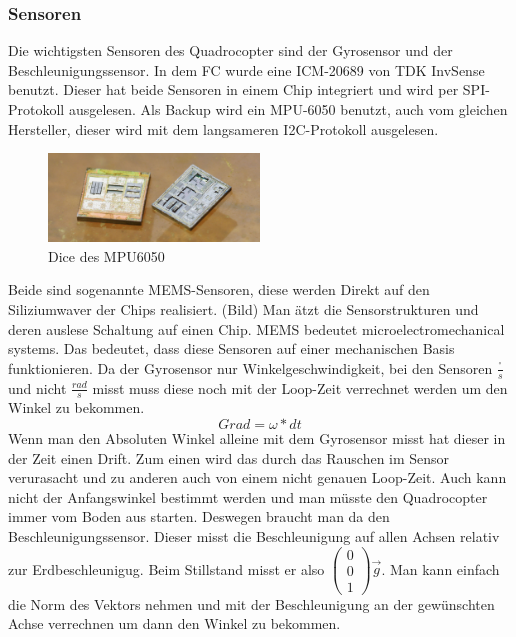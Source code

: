 \documentclass[12pt,a4paper, ngerman]{article}
\begin{document}
\subsubsection{Sensoren}
Die wichtigsten Sensoren des Quadrocopter sind der Gyrosensor und der Beschleunigungssensor. In dem FC wurde eine ICM-20689 von TDK InvSense benutzt. Dieser hat beide Sensoren in einem Chip integriert und wird per SPI-Protokoll ausgelesen. Als Backup wird ein MPU-6050 benutzt, auch vom gleichen Hersteller, dieser wird mit dem langsameren I2C-Protokoll ausgelesen. \\
\begin{figure}
\centering
\includegraphics[width=0.5\textwidth]{1920px-Mpu6050-HD.jpg}
\caption[https://de.wikipedia.org/wiki/TDK]{Dice des MPU6050}
\end{figure}
Beide sind sogenannte MEMS-Sensoren, diese werden Direkt auf den Siliziumwaver der Chips realisiert. (Bild) Man ätzt die Sensorstrukturen und deren auslese Schaltung auf einen Chip. MEMS bedeutet microelectromechanical systems. Das bedeutet, dass diese Sensoren auf einer mechanischen Basis funktionieren.
\newpage
\noindent
Da der Gyrosensor nur Winkelgeschwindigkeit, bei den Sensoren $\frac{^\circ}{s}$ und nicht $\frac{rad}{s}$ misst muss diese noch mit der Loop-Zeit verrechnet werden um den Winkel zu bekommen.
\begin{equation}
Grad=\omega*dt
\end{equation}
Wenn man den Absoluten Winkel alleine mit dem Gyrosensor misst hat dieser in der Zeit einen Drift. Zum einen wird das durch das Rauschen im Sensor verurasacht und zu anderen auch von einem nicht genauen Loop-Zeit. Auch kann nicht der Anfangswinkel bestimmt werden und man müsste den Quadrocopter immer vom Boden aus starten. Deswegen braucht man da den Beschleunigungssensor. Dieser misst die Beschleunigung auf allen Achsen relativ zur Erdbeschleunigug. Beim Stillstand misst er also
$
\begin{pmatrix}
0\\ 
0\\ 
1
\end{pmatrix}
\vec{g}
$. Man kann einfach die Norm des Vektors nehmen und mit der Beschleunigung an der gewünschten Achse verrechnen um dann den Winkel zu bekommen.
\end{document}
